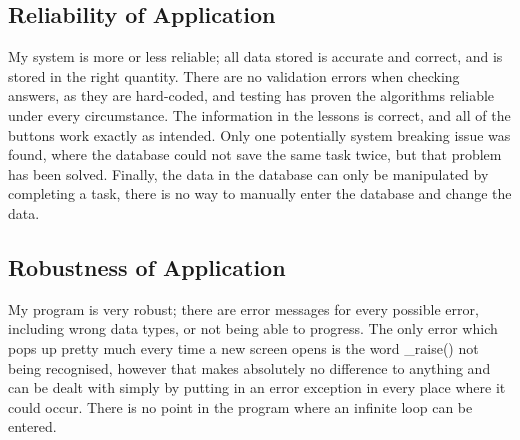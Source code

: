 \subsection{Reliability of Application}

My system is more or less reliable; all data stored is accurate and correct, and is stored in the right quantity. There are no validation errors when checking answers, as they are hard-coded, and testing has proven the algorithms reliable under every circumstance. The information in the lessons is correct, and all of the buttons work exactly as intended. Only one potentially system breaking issue was found, where the database could not save the same task twice, but that problem has been solved. Finally, the data in the database can only be manipulated by completing a task, there is no way to manually enter the database and change the data.

\subsection{Robustness of Application}

My program is very robust; there are error messages for every possible error, including wrong data types, or not being able to progress. The only error which pops up pretty much every time a new screen opens is the word \_raise() not being recognised, however that makes absolutely no difference to anything and can be dealt with simply by putting in an error exception in every place where it could occur. There is no point in the program where an infinite loop can be entered.

